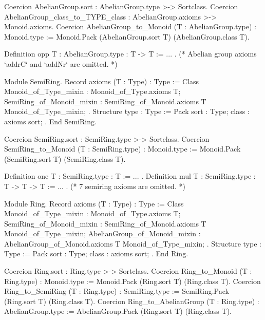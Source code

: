 \documentclass[a4paper,UKenglish,cleveref, autoref]{lipics-v2019}
\theoremstyle{implem}
\theoremstyle{implem}
\theoremstyle{command}
\begin{document}
\begin{coqcode}
Coercion AbelianGroup.sort : AbelianGroup.type >-> Sortclass.
Coercion AbelianGroup_class_to_TYPE_class : AbelianGroup.axioms >-> Monoid.axioms.
Coercion AbelianGroup_to_Monoid (T : AbelianGroup.type) : Monoid.type :=
  Monoid.Pack (AbelianGroup.sort T) (AbelianGroup.class T).

Definition opp {T : AbelianGroup.type} : T -> T := ... .
(* Abelian group axioms `addrC` and `addNr` are omitted. *)
\end{coqcode}



\begin{coqcode}
Module SemiRing.
Record axioms (T : Type) : Type := Class {
  Monoid_of_Type_mixin : Monoid_of_Type.axioms T;
  SemiRing_of_Monoid_mixin : SemiRing_of_Monoid.axioms T Monoid_of_Type_mixin; }.
Structure type : Type := Pack { sort : Type; class : axioms sort; }.
End SemiRing.
\end{coqcode}

\begin{coqcode}
Coercion SemiRing.sort : SemiRing.type >-> Sortclass.
Coercion SemiRing_to_Monoid (T : SemiRing.type) : Monoid.type :=
  Monoid.Pack (SemiRing.sort T) (SemiRing.class T).

Definition one {T : SemiRing.type} : T := ... .
Definition mul {T : SemiRing.type} : T -> T -> T := ... .
(* 7 semiring axioms are omitted. *)
\end{coqcode}



\begin{coqcode}
Module Ring.
Record axioms (T : Type) : Type := Class {
  Monoid_of_Type_mixin : Monoid_of_Type.axioms T;
  SemiRing_of_Monoid_mixin : SemiRing_of_Monoid.axioms T Monoid_of_Type_mixin;
  AbelianGroup_of_Monoid_mixin : AbelianGroup_of_Monoid.axioms T Monoid_of_Type_mixin; }.
Structure type : Type := Pack { sort : Type; class : axioms sort; }.
End Ring.
\end{coqcode}

\begin{coqcode}
Coercion Ring.sort : Ring.type >-> Sortclass.
Coercion Ring_to_Monoid (T : Ring.type) : Monoid.type :=
   Monoid.Pack (Ring.sort T) (Ring.class T).
Coercion Ring_to_SemiRing (T : Ring.type) : SemiRing.type :=
  SemiRing.Pack (Ring.sort T) (Ring.class T).
Coercion Ring_to_AbelianGroup (T : Ring.type) : AbelianGroup.type :=
  AbelianGroup.Pack (Ring.sort T) (Ring.class T).
\end{coqcode}
\end{document}
